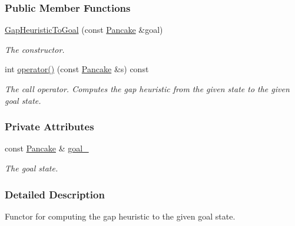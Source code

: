 \subsubsection*{Public Member Functions}
\begin{DoxyCompactItemize}
\item 
\hyperlink{structslb_1_1ext_1_1domain_1_1pancake_1_1GapHeuristicToGoal_a7cc1d87a1d31d85e9e1d284b8d054dfa}{Gap\+Heuristic\+To\+Goal} (const \hyperlink{structslb_1_1ext_1_1domain_1_1pancake_1_1Pancake}{Pancake} \&goal)
\begin{DoxyCompactList}\small\item\em The constructor. \end{DoxyCompactList}\item 
int \hyperlink{structslb_1_1ext_1_1domain_1_1pancake_1_1GapHeuristicToGoal_a6c1729a3aa1f8aacb5ab614e87ed8cb9}{operator()} (const \hyperlink{structslb_1_1ext_1_1domain_1_1pancake_1_1Pancake}{Pancake} \&s) const 
\begin{DoxyCompactList}\small\item\em The call operator. Computes the gap heuristic from the given state to the given goal state. \end{DoxyCompactList}\end{DoxyCompactItemize}
\subsubsection*{Private Attributes}
\begin{DoxyCompactItemize}
\item 
const \hyperlink{structslb_1_1ext_1_1domain_1_1pancake_1_1Pancake}{Pancake} \& \hyperlink{structslb_1_1ext_1_1domain_1_1pancake_1_1GapHeuristicToGoal_a49c66f8a7df7b89718d1be057b7f8fed}{goal\+\_\+}\hypertarget{structslb_1_1ext_1_1domain_1_1pancake_1_1GapHeuristicToGoal_a49c66f8a7df7b89718d1be057b7f8fed}{}\label{structslb_1_1ext_1_1domain_1_1pancake_1_1GapHeuristicToGoal_a49c66f8a7df7b89718d1be057b7f8fed}

\begin{DoxyCompactList}\small\item\em The goal state. \end{DoxyCompactList}\end{DoxyCompactItemize}


\subsubsection{Detailed Description}
Functor for computing the gap heuristic to the given goal state. 

